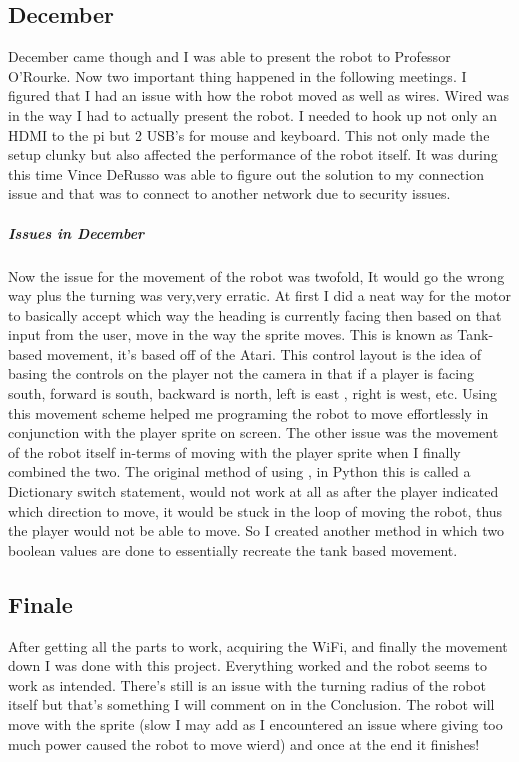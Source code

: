 \documentclass[13ptletterpaper]{paper}
\newcommand\tab[1][1cm]{\hspace*{#1}}
\begin{document}
\begin{flushleft}
		\subsection{December} 
		\tab December came though and I was able to present the robot to Professor O'Rourke. Now two important thing happened in the following meetings. I figured that I had an issue with how the robot moved as well as wires. Wired was in the way I had to actually present the robot. I needed to hook up not only an HDMI to the pi but 2 USB's for mouse and keyboard. This not only made the setup clunky but also affected the performance of the robot itself. It was during this time Vince DeRusso was able to figure out the solution to my connection issue and that was to connect to another network due to security issues. 
		\subparagraph{Issues in December} Now the issue for the movement of the robot was twofold, It would go the wrong way plus the turning was very,very erratic. At first I did a neat way for the motor to basically accept which way the heading is currently facing then based on that input from the user, move in the way the sprite moves. This is known as Tank-based movement, it's based off of the Atari. This control layout is the idea of basing the controls on the player not the camera in that if a player is facing south, forward is south, backward is north, left is east , right is west, etc. Using this movement scheme helped me programing the robot to move effortlessly in conjunction with the player sprite on screen. The other issue was the movement of the robot itself in-terms of moving with the player sprite when I finally combined the two. The original method of using , in Python this is called a Dictionary switch statement, would not work at all as after the player indicated which direction to move, it would be stuck in the loop of moving the robot, thus the player would not be able to move. So I created another method in which two boolean values are done to essentially recreate the tank based movement. 
		\subsection{Finale} 
		\tab After getting all the parts to work, acquiring the WiFi, and finally the movement down I was done with this project. Everything worked and the robot seems to work as intended. There's still is an issue with the turning radius of the robot itself but that's something I will comment on in the Conclusion. The robot will move with the sprite (slow I may add as I encountered an issue where giving too much power caused the robot to move wierd) and once at the end it finishes! 
		

\end{flushleft}
\end{document}
